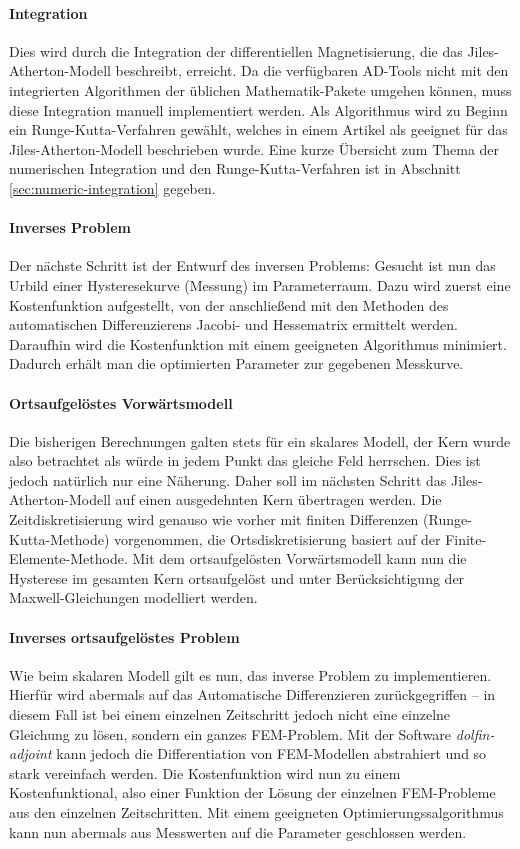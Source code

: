 \documentclass{scrartcl}
\begin{document}
\paragraph{Integration} Dies wird durch die Integration der differentiellen Magnetisierung, die das Jiles-Atherton-Modell beschreibt, erreicht. Da die verfügbaren AD-Tools nicht mit den  integrierten Algorithmen der üblichen Mathematik-Pakete umgehen können, muss diese Integration manuell implementiert werden. Als Algorithmus wird zu Beginn ein Runge-Kutta-Verfahren gewählt, welches in einem Artikel als geeignet für das Jiles-Atherton-Modell beschrieben wurde. Eine kurze Übersicht zum Thema der numerischen Integration und den Runge-Kutta-Verfahren ist in Abschnitt \ref{sec:numeric-integration} gegeben.
\paragraph{Inverses Problem} Der nächste Schritt ist der Entwurf des inversen Problems: Gesucht ist nun das Urbild einer Hysteresekurve (Messung) im Parameterraum. Dazu wird zuerst eine Kostenfunktion aufgestellt, von der anschließend mit den Methoden des automatischen Differenzierens Jacobi- und Hessematrix ermittelt werden. Daraufhin wird die Kostenfunktion mit einem geeigneten Algorithmus minimiert. Dadurch erhält man die optimierten Parameter zur gegebenen Messkurve.\\
\paragraph{Ortsaufgelöstes Vorwärtsmodell}
Die bisherigen Berechnungen galten stets für ein skalares Modell, der Kern wurde also betrachtet als würde in jedem Punkt das gleiche Feld herrschen. Dies ist jedoch natürlich nur eine Näherung. Daher soll im nächsten Schritt das Jiles-Atherton-Modell auf einen ausgedehnten Kern übertragen werden. Die Zeitdiskretisierung wird genauso wie vorher mit finiten Differenzen (Runge-Kutta-Methode) vorgenommen, die Ortsdiskretisierung basiert auf der Finite-Elemente-Methode. Mit dem ortsaufgelösten Vorwärtsmodell kann nun die Hysterese im gesamten Kern ortsaufgelöst und unter Berücksichtigung der Maxwell-Gleichungen modelliert werden.
\paragraph{Inverses ortsaufgelöstes Problem}
Wie beim skalaren Modell gilt es nun, das inverse Problem zu implementieren. Hierfür wird abermals auf das Automatische Differenzieren zurückgegriffen -- in diesem Fall ist bei einem einzelnen Zeitschritt jedoch nicht eine einzelne Gleichung zu lösen, sondern ein ganzes FEM-Problem. Mit der Software \emph{dolfin-adjoint} kann jedoch die Differentiation von FEM-Modellen abstrahiert und so stark vereinfach werden. Die Kostenfunktion wird nun zu einem Kostenfunktional, also einer Funktion der Lösung der einzelnen FEM-Probleme aus den einzelnen Zeitschritten. Mit einem geeigneten Optimierungssalgorithmus kann nun abermals aus Messwerten auf die Parameter geschlossen werden.
\end{document}
